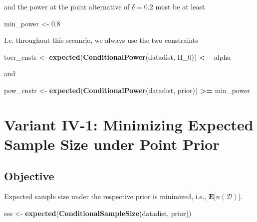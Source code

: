 \documentclass[]{book}
\newenvironment{Shaded}{\begin{snugshade}}{\end{snugshade}}
\newcommand{\DecValTok}[1]{\textcolor[rgb]{0.00,0.00,0.81}{#1}}
\newcommand{\FloatTok}[1]{\textcolor[rgb]{0.00,0.00,0.81}{#1}}
\newcommand{\KeywordTok}[1]{\textcolor[rgb]{0.13,0.29,0.53}{\textbf{#1}}}
\newcommand{\NormalTok}[1]{#1}
\newcommand{\OperatorTok}[1]{\textcolor[rgb]{0.81,0.36,0.00}{\textbf{#1}}}
\newcommand{\StringTok}[1]{\textcolor[rgb]{0.31,0.60,0.02}{#1}}
\begin{document}
and the power at the point alternative of \(\delta=0.2\) must
be at least

\begin{Shaded}
\begin{Highlighting}[]
\NormalTok{min_power <-}\StringTok{ }\FloatTok{0.8}
\end{Highlighting}
\end{Shaded}

I.e. throughout this sceanrio, we always use the two
constraints

\begin{Shaded}
\begin{Highlighting}[]
\NormalTok{toer_cnstr <-}\StringTok{ }\KeywordTok{expected}\NormalTok{(}\KeywordTok{ConditionalPower}\NormalTok{(datadist, H_}\DecValTok{0}\NormalTok{)) }\OperatorTok{<=}\StringTok{ }\NormalTok{alpha}
\end{Highlighting}
\end{Shaded}

and

\begin{Shaded}
\begin{Highlighting}[]
\NormalTok{pow_cnstr <-}\StringTok{ }\KeywordTok{expected}\NormalTok{(}\KeywordTok{ConditionalPower}\NormalTok{(datadist, prior)) }\OperatorTok{>=}\StringTok{ }\NormalTok{min_power}
\end{Highlighting}
\end{Shaded}

\hypertarget{variantIV_1}{%
\section{Variant IV-1: Minimizing Expected Sample Size under Point Prior}\label{variantIV_1}}

\hypertarget{objective-7}{%
\subsection{Objective}\label{objective-7}}

Expected sample size under the respective prior is minimized, i.e.,
\(\boldsymbol{E}\big[n(\mathcal{D})\big]\).

\begin{Shaded}
\begin{Highlighting}[]
\NormalTok{ess <-}\StringTok{ }\KeywordTok{expected}\NormalTok{(}\KeywordTok{ConditionalSampleSize}\NormalTok{(datadist, prior))}
\end{Highlighting}
\end{Shaded}
\end{document}
